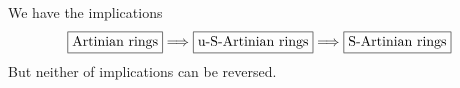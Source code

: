 \documentclass{article}
\begin{document}
We have the implications
$${\boxed{\mbox{Artinian rings}}}\Longrightarrow {\boxed{$u$\mbox{-}$S$\mbox{-Artinian rings}}}\Longrightarrow {\boxed{$S$\mbox{-Artinian rings}}}$$
But neither of implications can be reversed.
\end{document}
